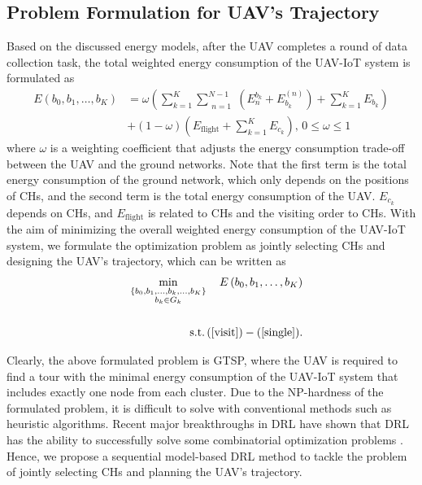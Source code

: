 \documentclass[journal]{IEEEtran}
\begin{document}
	\subsection{Problem Formulation for UAV's Trajectory}
	Based on the discussed energy models, after the UAV completes a round of data collection task, the total weighted energy consumption of the UAV-IoT system is formulated as
	\begin{align}
	\label{eq19}
	    E\left(b_0,b_1,\dots,b_K \right)
		&=\omega \left(\sum_{k=1}^{K}\sum_{\substack{n=1}}^{N-1}\left(E^{b_k}_n + E_{b_k}^{(n)}\right) + \sum_{k=1}^{K}E_{b_k}\right) \nonumber \\
		&+ (1-\omega) \left(E_{\text{flight}} + \sum_{k=1}^{K}E_{c_k}\right), \,0 \leq \omega \leq 1
	\end{align}
	where $\omega$ is a weighting coefficient that adjusts the energy consumption trade-off between the UAV and the ground networks. Note that the first term is the total energy consumption of the ground network, {which only depends on the positions of CHs,} and the second term is the total energy consumption of the UAV. {$E_{c_k}$ depends on CHs, and $E_{\text{flight}}$ is related to CHs and the visiting order to CHs.}
	With the aim of minimizing the overall weighted energy consumption of the UAV-IoT system, we formulate the optimization problem as jointly selecting CHs and designing the UAV's trajectory, which can be written as
	\begin{eqnarray}
	\label{objectivefunction}
	&&\min_{\substack{\{b_0,b_1,\dots,b_k,\dots, b_K\}\\ b_k\in G_{k}}} \quad  E\left(b_0,b_1,\dots,b_K \right) \nonumber\\
	\\
	&&\text{s.t.} \, (\ref{visit})-(\ref{single}).\nonumber
	\end{eqnarray}

Clearly, the above formulated problem is GTSP,  where the UAV is required to find a tour with the minimal energy consumption of the UAV-IoT system that includes exactly one node from each cluster. Due to the NP-hardness of the formulated problem, it is difficult to solve with conventional methods such as heuristic algorithms. Recent major breakthroughs in DRL have shown that DRL has the ability to successfully solve some combinatorial optimization problems \cite{I. Bello}. Hence, {we propose a sequential model-based DRL method to tackle the problem of jointly selecting CHs and planning the UAV's trajectory.}
	
\end{document}
